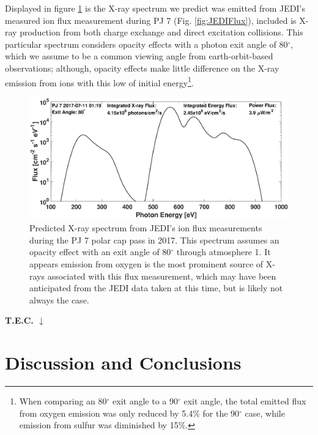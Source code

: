 \documentclass[draft]{agujournal2018}
\begin{document}
Displayed in figure \ref{fig:JEDISpec} is the X-ray spectrum we predict was emitted from JEDI's measured ion flux measurement during PJ 7 (Fig. \ref{fig:JEDIFlux}), included is X-ray production from both charge exchange and direct excitation collisions.
This particular spectrum considers opacity effects with a photon exit angle of 80$^{\circ}$, which we assume to be a common viewing angle from earth-orbit-based observations; although, opacity effects make little difference on the X-ray emission from ions with this low of initial energy\footnote{When comparing an 80$^{\circ}$ exit angle to a 90$^{\circ}$ exit angle, the total emitted flux from oxygen emission was only reduced by 5.4$\%$ for the 90$^{\circ}$ case, while emission from sulfur was diminished by 15$\%$.}.

\begin{figure}[ht]
    \centering
    \includegraphics[width=\textwidth]{Figures/PJ7Spectrum.eps}
    \caption{Predicted X-ray spectrum from JEDI's ion flux measurements during the PJ 7 polar cap pass in 2017. This spectrum assumes an opacity effect with an exit angle of 80$^{\circ}$ through atmosphere 1. It appears emission from oxygen is the most prominent source of X-rays associated with this flux measurement, which may have been anticipated from the JEDI data taken at this time, but is likely  not always the case.}
    \label{fig:JEDISpec}
\end{figure}

\noindent\textbf{\Large T.E.C. $\downarrow$}

\section{Discussion and Conclusions}

\end{document}
